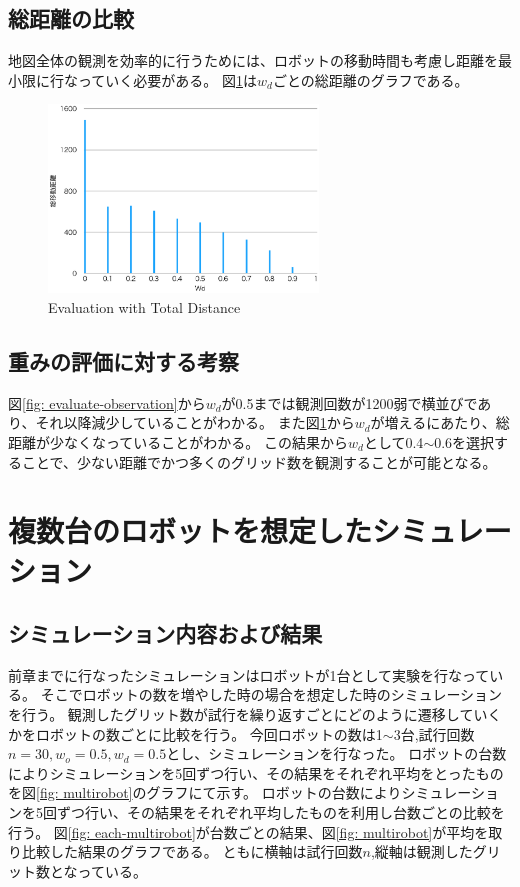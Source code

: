 \documentclass{jsarticle}
\begin{document}
\subsection{総距離の比較}
\label{evaluate-distance}
地図全体の観測を効率的に行うためには、ロボットの移動時間も考慮し距離を最小限に行なっていく必要がある。
図\ref{fig: evaluate-distance}は$w_d$ごとの総距離のグラフである。


\begin{figure}[tbh]
 \centering
  \includegraphics[height=50mm]{fig/evaluate-distance.eps}
  \vspace*{-4mm}
  \caption{Evaluation with Total Distance}
  \label{fig: evaluate-distance}
\end{figure}

\subsection{重みの評価に対する考察}
図\ref{fig: evaluate-observation}から$w_d$が0.5までは観測回数が1200弱で横並びであり、それ以降減少していることがわかる。
また図\ref{fig: evaluate-distance}から$w_d$が増えるにあたり、総距離が少なくなっていることがわかる。
この結果から$w_d$として0.4$\sim$0.6を選択することで、少ない距離でかつ多くのグリッド数を観測することが可能となる。

\section{複数台のロボットを想定したシミュレーション}
\subsection{シミュレーション内容および結果}

前章までに行なったシミュレーションはロボットが1台として実験を行なっている。
そこでロボットの数を増やした時の場合を想定した時のシミュレーションを行う。
観測したグリット数が試行を繰り返すごとにどのように遷移していくかをロボットの数ごとに比較を行う。
今回ロボットの数は1$\sim$3台,試行回数$n=30,w_o=0.5,w_d=0.5$とし、シミュレーションを行なった。
ロボットの台数によりシミュレーションを5回ずつ行い、その結果をそれぞれ平均をとったものを図\ref{fig: multirobot}のグラフにて示す。
ロボットの台数によりシミュレーションを5回ずつ行い、その結果をそれぞれ平均したものを利用し台数ごとの比較を行う。
図\ref{fig: each-multirobot}が台数ごとの結果、図\ref{fig: multirobot}が平均を取り比較した結果のグラフである。
ともに横軸は試行回数$n$,縦軸は観測したグリット数となっている。
\end{document}
